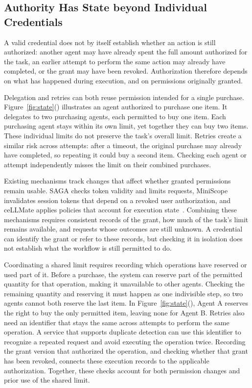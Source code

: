 \subsection{Authority Has State beyond Individual Credentials}\label{sec:rethink-state}
A valid credential does not by itself establish whether an action is still authorized: another agent may have already spent the full amount authorized for the task, an earlier attempt to perform the same action may already have completed, or the grant may have been revoked. Authorization therefore depends on what has happened during execution, and on permissions originally granted.

Delegation and retries can both reuse permission intended for a single purchase. Figure~\ref{fig:state}() illustrates an agent authorized to purchase one item. It delegates to two purchasing agents, each permitted to buy one item. Each purchasing agent stays within its own limit, yet together they can buy two items. These individual limits do not preserve the task's overall limit. Retries create a similar risk across attempts: after a timeout, the original purchase may already have completed, so repeating it could buy a second item. Checking each agent or attempt independently misses the limit on their combined purchases.

Existing mechanisms track changes that affect whether granted permissions remain usable. SAGA checks token validity and limits requests, MiniScope invalidates session tokens that depend on a revoked user authorization, and ceLLMate applies policies that account for execution state~\cite{saga,miniscope,cellmate}. Combining these mechanisms requires consistent records of the grant, how much of the task's limit remains available, and requests whose outcomes are still unknown. A credential can identify the grant or refer to these records, but checking it in isolation does not establish what the workflow is still permitted to do.

Coordinating a shared limit requires recording which operations have reserved or used part of it. Before a purchase, the system can reserve part of the permitted quantity for that operation, making it unavailable to other agents. Checking the remaining quantity and reserving it must happen as one indivisible step, so two agents cannot both reserve the last item. In Figure~\ref{fig:state}(), Agent A reserves the right to buy the only permitted item, leaving none for Agent B. Retries also need an identifier that stays the same across attempts to perform the same operation. A service that supports duplicate detection can use this identifier to recognize a repeated request and avoid executing the operation twice. Recording the grant version that authorized the operation, and checking whether that grant has been revoked, connects these execution records to the applicable authorization. Together, these checks account for both permission changes and prior use of the shared limit.

